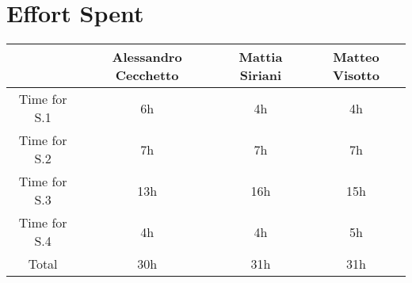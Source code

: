 \section{Effort Spent}
\begin{table}[h!]
    \centering
    \begin{tabular}{c||c|c|c}
     & Alessandro Cecchetto & Mattia Siriani & Matteo Visotto \\ \hline \hline
     
        Time for S.1 & 6h & 4h & 4h \\ \hline 
        Time for S.2 & 7h & 7h & 7h \\ \hline 
        Time for S.3 & 13h & 16h & 15h \\ \hline 
        Time for S.4 & 4h & 4h & 5h \\ \hline  \hline
        Total & 30h & 31h & 31h \\ \hline
    \end{tabular}
\end{table}